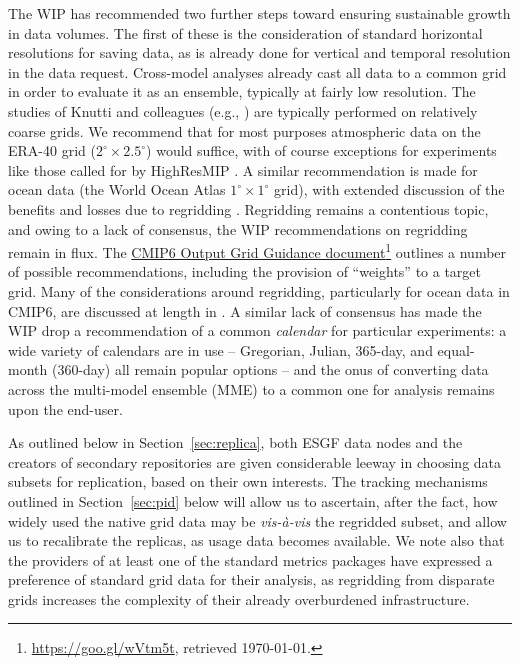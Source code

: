 \documentclass[gmd,manuscript]{copernicus}
\newcommand{\pllabel}[1]{\label{p-#1}\linelabel{l-#1}}
\newcommand{\urlref}[2] {\href{#1}{#2}\footnote{\url{#1}, retrieved \today.}}
\begin{document}
The WIP has recommended two further steps toward ensuring sustainable
growth in data volumes.
\pllabel{RC2-21}
The first of these is the consideration of standard horizontal
resolutions for saving data, as is already done for vertical and
temporal resolution in the data request. Cross-model analyses already
cast all data to a common grid in order to evaluate it as an ensemble,
typically at fairly low resolution. The studies of Knutti and
colleagues (e.g., \cite{ref:knuttietal2017}) are typically performed
on relatively coarse grids. We recommend that for most purposes
atmospheric data on the ERA-40 grid ($2^\circ\times 2.5^\circ$) would
suffice, with of course exceptions for experiments like those called
for by HighResMIP \citep{ref:haarsmaetal2016}. A similar
recommendation is made for ocean data (the World Ocean Atlas
$1^\circ\times 1^\circ$ grid), with extended discussion of the
benefits and losses due to regridding
\citep[see][]{ref:griffiesetal2014,ref:griffiesetal2016}. Regridding
remains a contentious topic, and owing to a lack of consensus, the WIP
recommendations on regridding remain in flux. The
\urlref{https://goo.gl/wVtm5t}{CMIP6 Output Grid Guidance document}
outlines a number of possible recommendations, including the provision
of ``weights'' to a target grid. Many of the considerations around
regridding, particularly for ocean data in CMIP6, are discussed at
length in \cite{ref:griffiesetal2016}. A similar lack of consensus has
made the WIP drop a recommendation of a common \emph{calendar} for
particular experiments: a wide variety of calendars are in use --
Gregorian, Julian, 365-day, and equal-month (360-day) all remain
popular options -- and the onus of converting data across the
multi-model ensemble (MME) to a common one for analysis remains upon
the end-user.

As outlined below in Section~\ref{sec:replica}, both ESGF data nodes
and the creators of secondary repositories are given considerable
leeway in choosing data subsets for replication, based on their own
interests. The tracking mechanisms outlined in Section~\ref{sec:pid}
below will allow us to ascertain, after the fact, how widely used the
native grid data may be \emph{vis-\`a-vis} the regridded subset, and
allow us to recalibrate the replicas, as usage data becomes available.
We note also that the providers of at least one of the standard
metrics packages \citep[ESMValTool,][]{ref:eyringetal2016a} have
expressed a preference of standard grid data for their analysis, as
regridding from disparate grids increases the complexity of their
already overburdened infrastructure.
\end{document}
